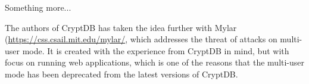 Something more...

The authors of CryptDB has taken the idea further with Mylar (\url{https://css.csail.mit.edu/mylar/}, which addresses the threat of attacks on multi-user mode. It is created with the experience from CryptDB in mind, but with focus on running web applications, which is one of the reasons that the multi-user mode has been deprecated from the latest versions of CryptDB.